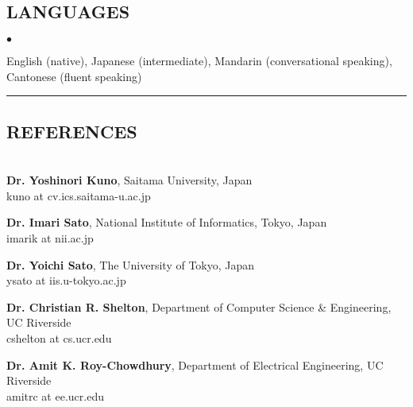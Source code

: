 \documentclass[letterpaper,10pt]{article}
\newcommand{\myline}{ \rule{\textwidth}{0.01in} }
\newenvironment{smallitemize}{
  \begin{list}{$\bullet$}{
    \setlength{\leftmargin}{3.5em}
        \setlength{\topmargin}{-1.0em}
    \setlength{\itemsep}{-0.10em}
    \setlength{\parskip}{-0.8em}
    \setlength{\parsep}{0.10em}
  }
}{
  \end{list}
}
\begin{document}
\subsection*{LANGUAGES}
\vspace{0.08in}
\begin{smallitemize} \normalfont
        \item English (native), Japanese (intermediate), Mandarin (conversational speaking), Cantonese (fluent speaking)
\end{smallitemize}
\vspace{-0.05in}
\pagebreak
\myline
\subsection*{REFERENCES}
\vspace{-0.1in}
\textbf{\\ Dr. Yoshinori Kuno}, Saitama University, Japan\\
kuno at cv.ics.saitama-u.ac.jp

\textbf{Dr. Imari Sato}, National Institute of Informatics, Tokyo, Japan\\
imarik at nii.ac.jp

\textbf{Dr. Yoichi Sato}, The University of Tokyo, Japan\\
ysato at iis.u-tokyo.ac.jp

\textbf{Dr. Christian R. Shelton}, Department of Computer Science \& Engineering, UC Riverside\\
cshelton at cs.ucr.edu

\textbf{Dr. Amit K. Roy-Chowdhury}, Department of Electrical Engineering, UC Riverside\\
amitrc at ee.ucr.edu
\end{document}
